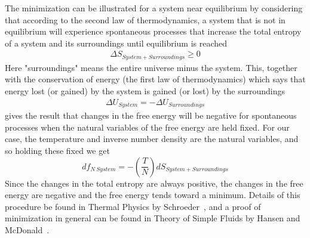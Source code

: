 \documentclass[double,12pt]{beavtex}
\begin{document}
The minimization can be illustrated for a system near 
equilibrium by considering that according to the 
second law of thermodynamics, a system that is not in equilibrium will 
experience spontaneous processes that increase the total entropy of a 
system and its surroundings until equilibrium is reached
\begin{align}
    \Delta{S}_{System + Surroundings} \geq 0 
\end{align}
Here "surroundings" means 
the entire universe minus the system. This, together with the conservation 
of energy (the first law of thermodynamics) which says that energy lost 
(or gained) by the system is gained (or lost) by the surroundings 
\begin{align}
    \Delta{U}_{System}=-\Delta{U}_{Surroundings} 
\end{align}
gives the result that 
changes in the free energy 
will be negative for spontaneous processes 
when the natural variables of the free energy are held fixed. 
For our case, the temperature and inverse number density are the natural 
variables, and so holding these fixed we get
\begin{equation}
  df_{N~System}=-\left(\frac{T}{N}\right)dS_{System+Surroundings}
\end{equation}
Since the changes in the total entropy are always positive, the changes
in the free energy are negative and the free energy tends toward a minimum. 
Details of this procedure be found in Thermal Physics by Schroeder~\cite{schroeder}, 
and a proof of minimization in general can be found in 
Theory of Simple Fluids by Hansen and McDonald~\cite{Hansen}.
\end{document}
